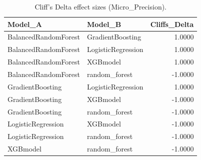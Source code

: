 \begin{table}[t]
\centering
\begin{tabular}{llr}
\toprule
Model_A & Model_B & Cliffs_Delta \\
\midrule
BalancedRandomForest & GradientBoosting & 1.0000 \\
BalancedRandomForest & LogisticRegression & 1.0000 \\
BalancedRandomForest & XGBmodel & 1.0000 \\
BalancedRandomForest & random_forest & -1.0000 \\
GradientBoosting & LogisticRegression & 1.0000 \\
GradientBoosting & XGBmodel & -1.0000 \\
GradientBoosting & random_forest & -1.0000 \\
LogisticRegression & XGBmodel & -1.0000 \\
LogisticRegression & random_forest & -1.0000 \\
XGBmodel & random_forest & -1.0000 \\
\bottomrule
\end{tabular}
\caption{Cliff's Delta effect sizes (Micro_Precision).}
\label{tab:cliffs_Micro_Precision}
\end{table}